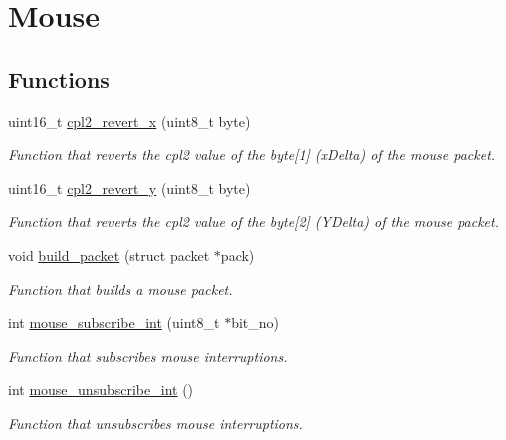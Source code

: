\hypertarget{group__mouse}{}\section{Mouse}
\label{group__mouse}
\subsection*{Functions}
\begin{DoxyCompactItemize}
\item 
uint16\+\_\+t \hyperlink{group__mouse_gaca472150bedc1bf9e0008ffd9929b165}{cpl2\+\_\+revert\+\_\+x} (uint8\+\_\+t byte)
\begin{DoxyCompactList}\small\item\em Function that reverts the cpl2 value of the byte\mbox{[}1\mbox{]} (x\+Delta) of the mouse packet. \end{DoxyCompactList}\item 
uint16\+\_\+t \hyperlink{group__mouse_gaf9b79deb06853057db6850cb4b7ec917}{cpl2\+\_\+revert\+\_\+y} (uint8\+\_\+t byte)
\begin{DoxyCompactList}\small\item\em Function that reverts the cpl2 value of the byte\mbox{[}2\mbox{]} (Y\+Delta) of the mouse packet. \end{DoxyCompactList}\item 
void \hyperlink{group__mouse_ga7d38d68c1222c116e819346c1c3d36f1}{build\+\_\+packet} (struct packet $\ast$pack)
\begin{DoxyCompactList}\small\item\em Function that builds a mouse packet. \end{DoxyCompactList}\item 
int \hyperlink{group__mouse_ga9da18257ff113b686bb826d154bfaa87}{mouse\+\_\+subscribe\+\_\+int} (uint8\+\_\+t $\ast$bit\+\_\+no)
\begin{DoxyCompactList}\small\item\em Function that subscribes mouse interruptions. \end{DoxyCompactList}\item 
int \hyperlink{group__mouse_ga685ad2706aca36d9869a30a19b9f446a}{mouse\+\_\+unsubscribe\+\_\+int} ()
\begin{DoxyCompactList}\small\item\em Function that unsubscribes mouse interruptions. \end{DoxyCompactList}\item 
\mbox{\label{group__mouse_ga210374b50462acdedab00df64d5cea3c}} 

\end{DoxyCompactItemize}
